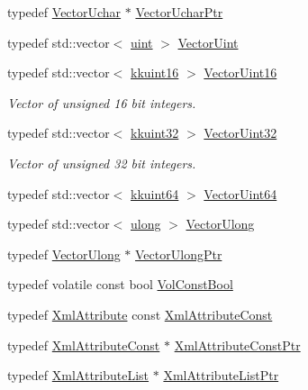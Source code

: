 \begin{DoxyCompactItemize}
typedef \hyperlink{namespace_k_k_b_a2e345982c9a919580d77a11178ad920a}{Vector\+Uchar} $\ast$ \hyperlink{namespace_k_k_b_ac43cb621a63d628438a729543638a404}{Vector\+Uchar\+Ptr}
\item 
typedef std\+::vector$<$ \hyperlink{namespace_k_k_b_ab8557ae1b1f2361659d82a890e2f8014}{uint} $>$ \hyperlink{namespace_k_k_b_a199042935a7ad6d22354bc8f0090b938}{Vector\+Uint}
\item 
typedef std\+::vector$<$ \hyperlink{namespace_k_k_b_aa8c7d4d30381c8a0b6fce68974a9c8a9}{kkuint16} $>$ \hyperlink{namespace_k_k_b_a4f57cb1872dd1448f1e20798475afc06}{Vector\+Uint16}
\begin{DoxyCompactList}\small\item\em Vector of unsigned 16 bit integers. \end{DoxyCompactList}\item 
typedef std\+::vector$<$ \hyperlink{namespace_k_k_b_af8d832f05c54994a1cce25bd5743e19a}{kkuint32} $>$ \hyperlink{namespace_k_k_b_ab5f0d7bc82b746e1e75e48a6394ccb60}{Vector\+Uint32}
\begin{DoxyCompactList}\small\item\em Vector of unsigned 32 bit integers. \end{DoxyCompactList}\item 
typedef std\+::vector$<$ \hyperlink{namespace_k_k_b_a1f2b0568d3b63cc7697dcff73250113e}{kkuint64} $>$ \hyperlink{namespace_k_k_b_a04089b7368e1a306b1c5689ac46ce19a}{Vector\+Uint64}
\item 
typedef std\+::vector$<$ \hyperlink{namespace_k_k_b_ad16da29960588b11a873b8b16b197396}{ulong} $>$ \hyperlink{namespace_k_k_b_ac8e4b77afddb0db278beb180dae0b6dc}{Vector\+Ulong}
\item 
typedef \hyperlink{namespace_k_k_b_ac8e4b77afddb0db278beb180dae0b6dc}{Vector\+Ulong} $\ast$ \hyperlink{namespace_k_k_b_a7122b1e95aed86a78a6b6d378deecd5d}{Vector\+Ulong\+Ptr}
\item 
typedef volatile const bool \hyperlink{namespace_k_k_b_a7d390f568e2831fb76b86b56c87bf92f}{Vol\+Const\+Bool}
\item 
typedef \hyperlink{class_k_k_b_1_1_xml_attribute}{Xml\+Attribute} const \hyperlink{namespace_k_k_b_a52995273e2b6fbc01d455674b3ec0a2f}{Xml\+Attribute\+Const}
\item 
typedef \hyperlink{namespace_k_k_b_a52995273e2b6fbc01d455674b3ec0a2f}{Xml\+Attribute\+Const} $\ast$ \hyperlink{namespace_k_k_b_afa7c3acb722883d8287413976084f230}{Xml\+Attribute\+Const\+Ptr}
\item 
typedef \hyperlink{class_k_k_b_1_1_xml_attribute_list}{Xml\+Attribute\+List} $\ast$ \hyperlink{namespace_k_k_b_aecd3ac562232833cabb5bb2ffe86ddac}{Xml\+Attribute\+List\+Ptr}

\end{DoxyCompactItemize}

